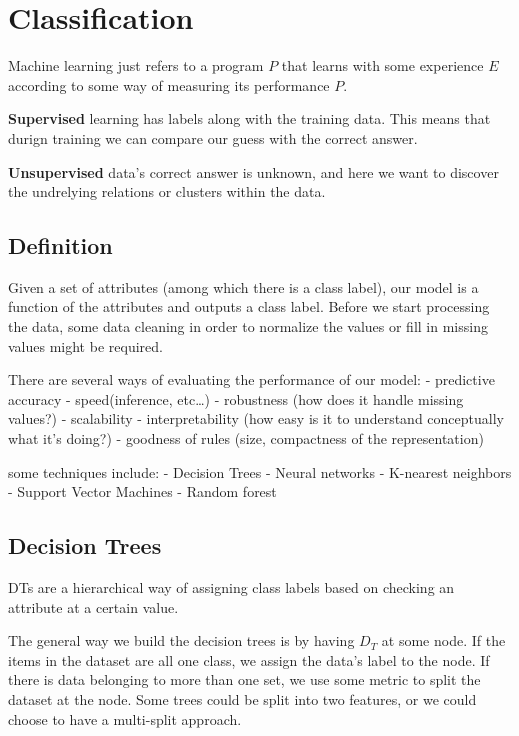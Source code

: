 \documentclass[
  paper=a4,
,captions=tableheading
]{scrartcl}
\date{}
\title{}
\author{}
\begin{document}




\hypertarget{classification}{%
\section{Classification}\label{classification}}

Machine learning just refers to a program \(P\) that learns with some
experience \(E\) according to some way of measuring its performance
\(P\).

\textbf{Supervised} learning has labels along with the training data.
This means that durign training we can compare our guess with the
correct answer.

\textbf{Unsupervised} data's correct answer is unknown, and here we want
to discover the undrelying relations or clusters within the data.

\hypertarget{definition}{%
\subsection{Definition}\label{definition}}

Given a set of attributes (among which there is a class label), our
model is a function of the attributes and outputs a class label. Before
we start processing the data, some data cleaning in order to normalize
the values or fill in missing values might be required.

There are several ways of evaluating the performance of our model: -
predictive accuracy - speed(inference, etc\ldots) - robustness (how does
it handle missing values?) - scalability - interpretability (how easy is
it to understand conceptually what it's doing?) - goodness of rules
(size, compactness of the representation)

some techniques include: - Decision Trees - Neural networks - K-nearest
neighbors - Support Vector Machines - Random forest

\hypertarget{decision-trees}{%
\subsection{Decision Trees}\label{decision-trees}}

DTs are a hierarchical way of assigning class labels based on checking
an attribute at a certain value.

The general way we build the decision trees is by having \(D_{T}\) at
some node. If the items in the dataset are all one class, we assign the
data's label to the node. If there is data belonging to more than one
set, we use some metric to split the dataset at the node. Some trees
could be split into two features, or we could choose to have a
multi-split approach.
\end{document}
